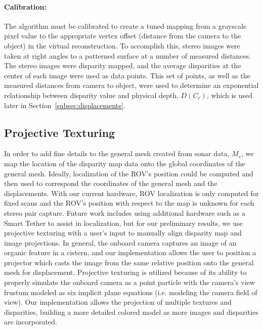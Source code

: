 \documentclass{llncs}
\begin{document}

\paragraph{\textbf{Calibration:}}
The algorithm must be calibrated to create a tuned mapping from a grayscale pixel value to the appropriate vertex offset (distance from the camera to the object) in the virtual reconstruction. To accomplish this, stereo images were taken at right angles to a patterned surface at a number of measured distances. The stereo images were disparity mapped, and the average disparities at the center of each image were used as data points. This set of points, as well as the measured distances from camera to object, were used to determine an exponential relationship between disparity value and physical depth, $D(C_r)$, which is used later in Section~\ref{subsec:displacements}.

\subsection{Projective Texturing}
\label{subsec:projectiveTexturing}
\noindent In order to add fine details to the general mesh created from sonar data, $M_s$, we map the location of the disparity map data onto the global coordinates of the general mesh. Ideally, localization of the ROV's position could be computed and then used to correspond the coordinates of the general mesh and the displacements. With our current hardware, ROV localization is only computed for fixed scans and the ROV's position with respect to the map is unknown for each stereo pair capture. Future work includes using additional hardware such as a Smart Tether to assist in localization, but for our preliminary results, we use projective texturing with a user's input to manually align disparity map and image projections. In general, the onboard camera captures an image of an organic feature in a cistern, and our implementation allows the user to position a projector which casts the image from the same relative position onto the general mesh for displacement. Projective texturing is utilized because of its ability to properly simulate the onboard camera as a point particle with the camera's view frustum modeled as six implicit plane equations (i.e. modeling the camera field of view). Our implementation allows the projection of multiple textures and disparities, building a more detailed colored model as more images and disparities are incorporated.
\end{document}
